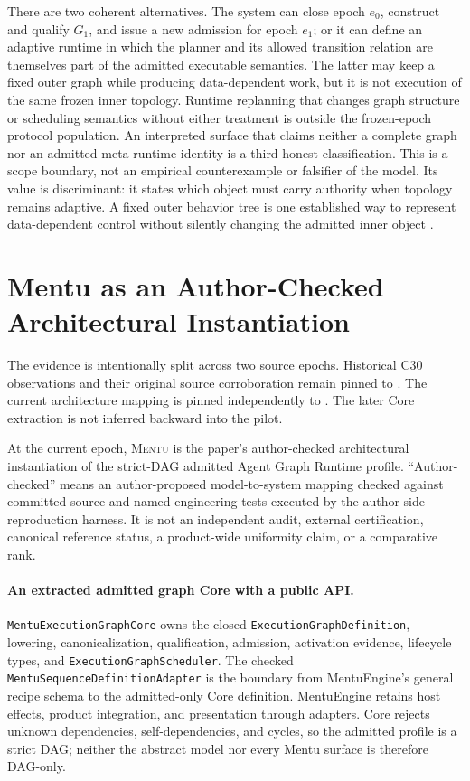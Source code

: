\documentclass[11pt]{article}
\newcommand{\mentu}{\textsc{Mentu}}
\newcommand{\code}[1]{\texttt{#1}}
\begin{document}
There are two coherent alternatives. The system can close epoch \(e_0\),
construct and qualify \(G_1\), and issue a new admission for epoch \(e_1\); or
it can define an adaptive runtime in which the planner and its allowed
transition relation are themselves part of the admitted executable semantics.
The latter may keep a fixed outer graph while producing data-dependent work,
but it is not execution of the same frozen inner topology. Runtime replanning
that changes graph structure or scheduling semantics without either treatment
is outside the frozen-epoch protocol population. An interpreted surface
that claims neither a complete graph nor an admitted meta-runtime identity is
a third honest classification. This is a scope boundary, not an empirical
counterexample or falsifier of the model. Its value is discriminant: it states
which object must carry authority when topology remains adaptive. A fixed outer
behavior tree is one established way to represent data-dependent control
without silently changing the admitted inner object
\cite{Colledanchise2017BehaviorTrees}.

\section{Mentu as an Author-Checked Architectural Instantiation}

The evidence is intentionally split across two source epochs. Historical C30
observations and their original source corroboration remain pinned to
\code{\MentuCommitShort}. The current architecture mapping is pinned
independently to \code{\MentuCurrentCommitShort}. The later Core extraction is
not inferred backward into the pilot.

At the current epoch, \mentu{} is the paper's author-checked architectural
instantiation of the strict-DAG admitted Agent Graph Runtime profile.
``Author-checked'' means an author-proposed model-to-system mapping checked
against committed source and named engineering tests executed by the
author-side reproduction harness. It is not an independent audit, external
certification, canonical reference status, a product-wide uniformity claim, or
a comparative rank.

\paragraph{An extracted admitted graph Core with a public API.}
\code{MentuExecutionGraphCore} owns the closed
\code{ExecutionGraph\allowbreak Definition}, lowering, canonicalization, qualification,
admission, activation evidence, lifecycle types, and
\code{ExecutionGraph\allowbreak Scheduler}. The checked
\code{MentuSequence\allowbreak Definition\allowbreak Adapter} is the boundary from MentuEngine's
general recipe schema to the admitted-only Core definition. MentuEngine retains
host effects, product integration, and presentation through adapters. Core
rejects unknown dependencies, self-dependencies, and cycles, so the admitted
profile is a strict DAG; neither the abstract model nor every Mentu surface is
therefore DAG-only.
\end{document}
